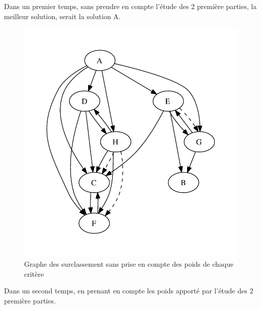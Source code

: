 Dans un premier temps, sans prendre en compte l'étude des 2 première parties, la meilleur solution, serait la solution A.

\begin{figure}
\includegraphics{../SourcesMatlab/electre3-1.pdf}
\caption{Graphe des surclassement sans prise en compte des poids de chaque critère}
\end{figure}

Dans un second temps, en prenant en compte les poids apporté par l'étude des 2 première parties.